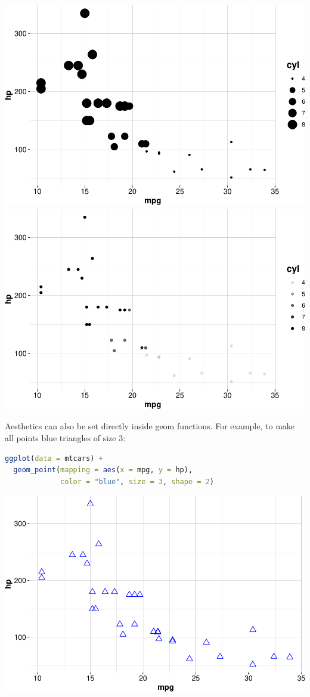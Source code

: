 \documentclass[
]{book}
\theoremstyle{definition}
\theoremstyle{definition}
\theoremstyle{definition}
\theoremstyle{definition}
\theoremstyle{remark}
\begin{document}
\includegraphics[width=0.5\linewidth]{Intro-R_files/figure-latex/unnamed-chunk-38-1} \includegraphics[width=0.5\linewidth]{Intro-R_files/figure-latex/unnamed-chunk-38-2}

Aesthetics can also be set directly inside geom functions. For example, to make all points blue triangles of size 3:

\begin{lstlisting}[language=R]
ggplot(data = mtcars) +
  geom_point(mapping = aes(x = mpg, y = hp), 
             color = "blue", size = 3, shape = 2)
\end{lstlisting}

\begin{center}\includegraphics{Intro-R_files/figure-latex/unnamed-chunk-39-1} \end{center}
\end{document}

